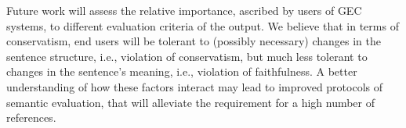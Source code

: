 \documentclass[letter,11pt]{article}
\begin{document}
%
%
%

Future work will assess the relative importance, ascribed by users of GEC systems,
to different evaluation criteria of the output. We believe that in terms of conservatism,
end users will be tolerant to (possibly necessary) changes in the sentence structure, i.e.,
violation of conservatism, but much less tolerant to changes in the sentence's meaning,
i.e., violation of faithfulness. A better understanding of how these factors interact
may lead to improved protocols of semantic evaluation, that will alleviate the requirement
for a high number of references.




\end{document}
